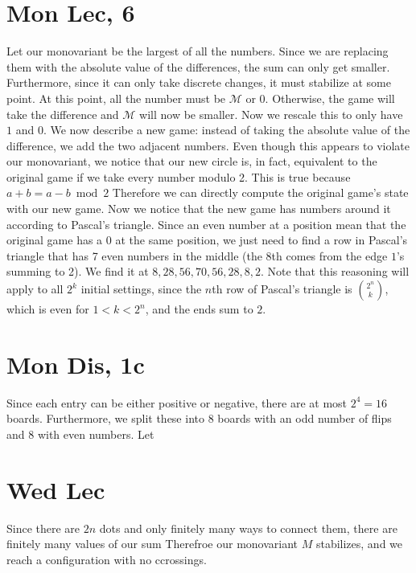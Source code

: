 \documentclass[12pt]{article}
\newcommand{\M}{\mathcal{M}}
\begin{document}
\section{Mon Lec, 6}
Let our monovariant be the largest of all the numbers. Since we are replacing them with the absolute value of the differences, the sum can only get smaller. Furthermore, since it can only take discrete changes, it must stabilize at some point.
\newline
At this point, all the number must be $\M$ or 0. Otherwise, the game will take the difference and $\M$ will now be smaller. Now we rescale this to only have $1$ and $0$.
\newline
We now describe a new game: instead of taking the absolute value of the difference, we add the two adjacent numbers. Even though this appears to violate our monovariant, we notice that our new circle is, in fact, equivalent to the original game if we take every number modulo 2. This is true because $a+b = a-b \bmod 2$ Therefore we can directly compute the original game's state with our new game.
\newline
Now we notice that the new game has numbers around it according to Pascal's triangle. Since an even number at a position mean that the original game has a $0$ at the same position, we just need to find a row in Pascal's triangle that has 7 even numbers in the middle (the 8th comes from the edge $1$'s summing to 2). We find it at $8, 28,56,70,56,28,8,2$.
\newline
Note that this reasoning will apply to all $2^k$ initial settings, since the $n$th row of Pascal's triangle is $\binom{2^n}{k}$, which is even for $1<k<2^n$, and the ends sum to $2$.


\section{Mon Dis, 1c}
Since each entry can be either positive or negative, there are at most $2^{4} = 16$ boards. Furthermore, we split these into 8 boards with an odd number of flips and 8 with even numbers.
\newline
Let


\section{Wed Lec}
Since there are $2n$ dots and only finitely many ways to connect them, there are finitely many values of our sum
Therefroe our monovariant $M$ stabilizes, and we reach a configuration with no ccrossings.
\end{document}

